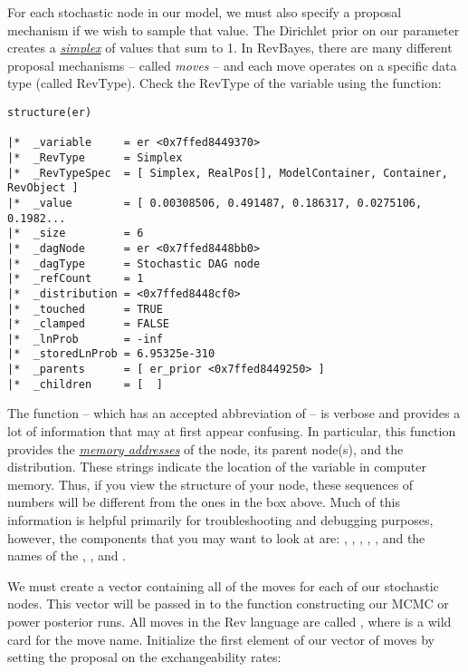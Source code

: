 For each stochastic node in our model, we must also specify a proposal mechanism if we wish to sample that value. 
The Dirichlet prior on our parameter  creates a \href{http://en.wikipedia.org/wiki/Simplex}{\textit{simplex}} of values that sum to 1. 
In RevBayes, there are many different proposal mechanisms -- called \textit{moves} -- and each move operates on a specific data type (called RevType). 
Check the RevType of the variable  using the  function:
{\tt \small \begin{snugshade*}
\begin{lstlisting}
structure(er)

|*  _variable     = er <0x7ffed8449370>
|*  _RevType      = Simplex
|*  _RevTypeSpec  = [ Simplex, RealPos[], ModelContainer, Container, RevObject ]
|*  _value        = [ 0.00308506, 0.491487, 0.186317, 0.0275106, 0.1982...
|*  _size         = 6
|*  _dagNode      = er <0x7ffed8448bb0>
|*  _dagType      = Stochastic DAG node
|*  _refCount     = 1
|*  _distribution = <0x7ffed8448cf0>
|*  _touched      = TRUE
|*  _clamped      = FALSE
|*  _lnProb       = -inf
|*  _storedLnProb = 6.95325e-310
|*  _parents      = [ er_prior <0x7ffed8449250> ]
|*  _children     = [  ]
\end{lstlisting}
\end{snugshade*}}

The  function -- which has an accepted abbreviation of  -- is verbose and provides a lot of information that may at first appear confusing. 
In particular, this function provides the \href{http://en.wikipedia.org/wiki/Memory_address}{\textit{memory addresses}} of the node, its parent node(s), and the distribution. 
These strings indicate the location of the variable in computer memory. 
Thus, if you view the structure of your  node, these sequences of numbers will be different from the ones in the box above. 
Much of this information is helpful primarily for troubleshooting and debugging purposes, however, the components that you may want to look at are: , , , , , and the names of the , , and .

We must create a vector containing all of the moves for each of our stochastic nodes. 
This vector will be passed in to the function constructing our MCMC or power posterior runs.
All moves in the Rev language are called , where \cl{*} is a wild card for the move name. 
Initialize the first element of our vector of moves by setting the proposal on the exchangeability rates:

